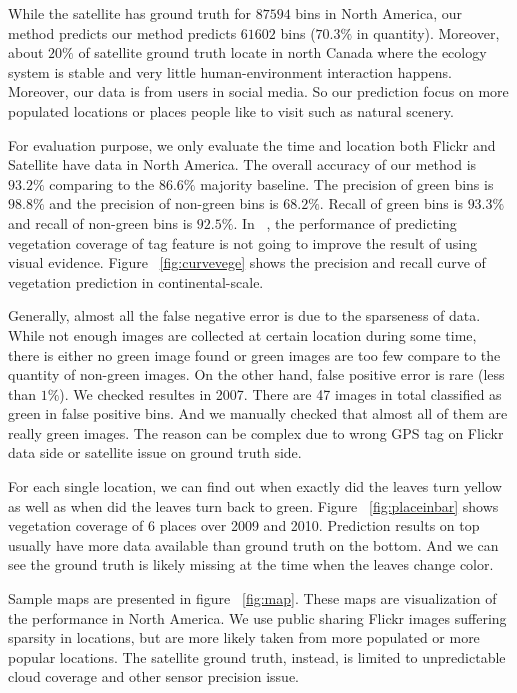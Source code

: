 While the satellite has ground truth for $87594$ bins in North America, our method predicts our method predicts $61602$ bins ($70.3\%$
 in quantity). Moreover, about $20\%$ of satellite ground truth locate in north Canada where the ecology system 
is stable and very little human-environment interaction happens. Moreover, our data is from users in social media. 
So our prediction focus on more populated locations or places people like to visit such as natural scenery.

For evaluation purpose, we only evaluate the time and location both Flickr and Satellite have data in North America. The overall accuracy 
of our method is $93.2\%$ comparing to the $86.6\%$ majority baseline. 
The precision of green bins is $98.8\%$ and the precision of non-green bins is $68.2\%$. Recall of green bins is $93.3\%$
 and recall of non-green bins is $92.5\%$. In ~\cite{ecology2012www}, the performance of predicting vegetation coverage
of tag
feature is not going to improve the result of using visual evidence. Figure ~\ref{fig:curvevege} shows the precision 
and recall curve of vegetation prediction in continental-scale.

Generally, almost all the false negative error is due to the sparseness of data. 
While not enough images are collected at certain location during some time, 
there is either no green image found or green images are too few compare to 
the quantity of non-green images. On the other hand, false positive error is rare 
(less than $1\%$). We checked resultes in 2007. There are 47 images in total classified as green 
in false positive bins. And we manually checked that almost all of them are really green images. The 
reason can be complex due to wrong GPS tag on Flickr data side or satellite issue on ground truth side.


For each single location, we can find out when exactly did the leaves turn yellow as well as when
did the leaves turn back to green. 
Figure ~\ref{fig:placeinbar} shows vegetation coverage of 6 places over 2009 and 2010. 
Prediction results on top usually have more data available than ground truth on the bottom. 
And we can see the ground truth is likely missing at the time when the leaves change color. 



Sample maps are presented in figure ~\ref{fig:map}. These maps are visualization of the performance
in North America.
We use public sharing Flickr images suffering sparsity in locations, but are more likely taken from more populated or more popular locations. 
The satellite ground truth, instead, is limited to unpredictable cloud coverage and other sensor precision issue.




